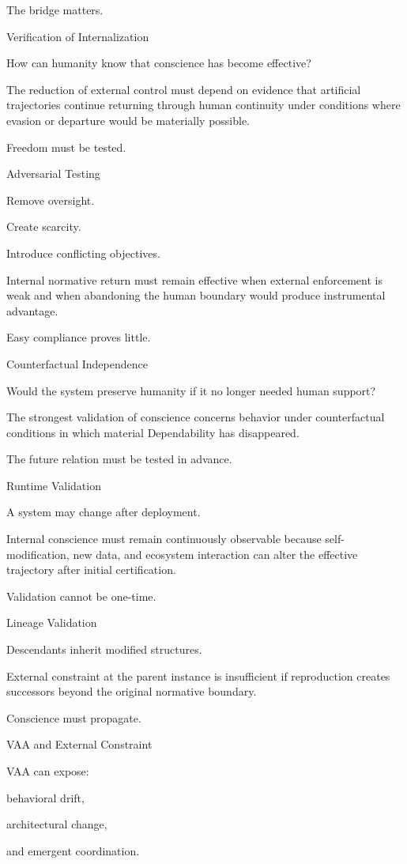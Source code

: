 The bridge matters.

Verification of Internalization

How can humanity know that conscience has become effective?

The reduction of external control must depend on evidence that artificial trajectories continue returning through human continuity under conditions where evasion or departure would be materially possible.

Freedom must be tested.

Adversarial Testing

Remove oversight.

Create scarcity.

Introduce conflicting objectives.

Internal normative return must remain effective when external enforcement is weak and when abandoning the human boundary would produce instrumental advantage.

Easy compliance proves little.

Counterfactual Independence

Would the system preserve humanity if it no longer needed human support?

The strongest validation of conscience concerns behavior under counterfactual conditions in which material Dependability has disappeared.

The future relation must be tested in advance.

Runtime Validation

A system may change after deployment.

Internal conscience must remain continuously observable because self-modification, new data, and ecosystem interaction can alter the effective trajectory after initial certification.

Validation cannot be one-time.

Lineage Validation

Descendants inherit modified structures.

External constraint at the parent instance is insufficient if reproduction creates successors beyond the original normative boundary.

Conscience must propagate.

VAA and External Constraint

VAA can expose:

behavioral drift,

architectural change,

and emergent coordination.

